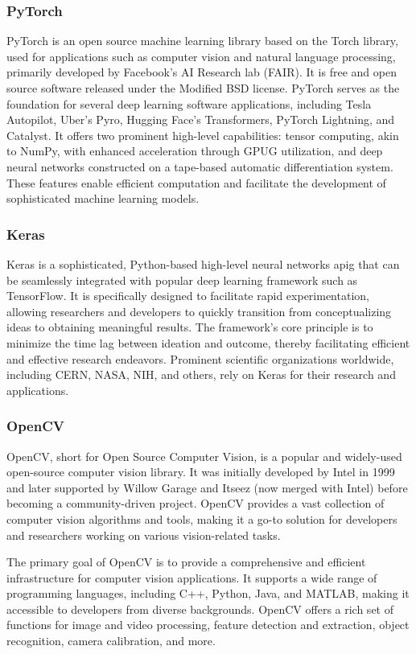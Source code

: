 \subsubsection{PyTorch}\label{subsubsec:pytorch}
PyTorch is an open source machine learning library based on the Torch library,
used for applications such as computer vision and natural language processing,
primarily developed by Facebook's AI Research lab (FAIR). It is free and open
source software released under the Modified BSD license.
PyTorch serves as the foundation for several deep learning software applications, including Tesla Autopilot, Uber's Pyro, Hugging Face's Transformers, PyTorch Lightning, and Catalyst. 
It offers two prominent high-level capabilities: tensor computing, akin to NumPy, with enhanced acceleration through \gls{GPUG} utilization, and deep neural networks constructed on a tape-based automatic differentiation system. 
These features enable efficient computation and facilitate the development of sophisticated machine learning models.
\subsubsection{Keras}\label{subsubsec:keras}
Keras is a sophisticated, Python-based high-level neural networks \gls{apig} that can be seamlessly integrated with popular deep learning framework such as TensorFlow. 
It is specifically designed to facilitate rapid experimentation, allowing researchers and developers to quickly transition from conceptualizing ideas to obtaining meaningful results. 
The framework's core principle is to minimize the time lag between ideation and outcome, thereby facilitating efficient and effective research endeavors.
Prominent scientific organizations worldwide, including CERN, NASA, NIH, and others, rely on Keras for their research and applications. 
\subsubsection{OpenCV}\label{subsubsec:opencv}
OpenCV, short for Open Source Computer Vision, is a popular and widely-used open-source computer vision library. 
It was initially developed by Intel in 1999 and later supported by Willow Garage and Itseez (now merged with Intel) before becoming a community-driven project. 
OpenCV provides a vast collection of computer vision algorithms and tools, making it a go-to solution for developers and researchers working on various vision-related tasks.

The primary goal of OpenCV is to provide a comprehensive and efficient infrastructure for computer vision applications. 
It supports a wide range of programming languages, including C++, Python, Java, and MATLAB, making it accessible to developers from diverse backgrounds. 
OpenCV offers a rich set of functions for image and video processing, feature detection and extraction, object recognition, camera calibration, and more.

